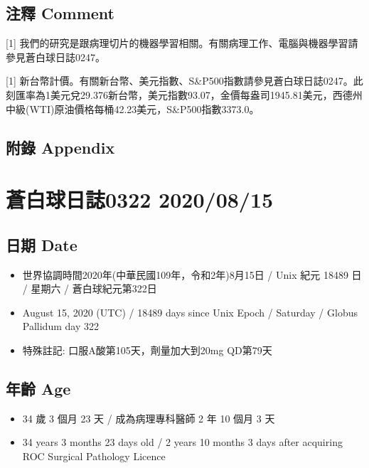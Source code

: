 \documentclass[a5paper, 11pt
]{book}
\providecommand{\tightlist}{%
  \setlength{\itemsep}{0pt}\setlength{\parskip}{0pt}}
\begin{document}
\hypertarget{ux6ce8ux91cb-comment-64}{%
\subsection{注釋 Comment}\label{ux6ce8ux91cb-comment-64}}

{[}1{]}
我們的研究是跟病理切片的機器學習相關。有關病理工作、電腦與機器學習請參見蒼白球日誌0247。

{[}1{]}
新台幣計價。有關新台幣、美元指數、S\&P500指數請參見蒼白球日誌0247。此刻匯率為1美元兌29.376新台幣，美元指數93.07，金價每盎司1945.81美元，西德州中級(WTI)原油價格每桶42.23美元，S\&P500指數3373.0。

\hypertarget{ux9644ux9304-appendix-64}{%
\subsection{附錄 Appendix}\label{ux9644ux9304-appendix-64}}

\hypertarget{ux84bcux767dux7403ux65e5ux8a8c0322-20200815}{%
\section{蒼白球日誌0322
2020/08/15}\label{ux84bcux767dux7403ux65e5ux8a8c0322-20200815}}

\hypertarget{ux65e5ux671f-date-65}{%
\subsection{日期 Date}\label{ux65e5ux671f-date-65}}

\begin{itemize}
\tightlist
\item
  世界協調時間2020年(中華民國109年，令和2年)8月15日 / Unix 紀元 18489 日
  / 星期六 / 蒼白球紀元第322日
\item
  August 15, 2020 (UTC) / 18489 days since Unix Epoch / Saturday /
  Globus Pallidum day 322
\item
  特殊註記: 口服A酸第105天，劑量加大到20mg QD第79天
\end{itemize}

\hypertarget{ux5e74ux9f61-age-65}{%
\subsection{年齡 Age}\label{ux5e74ux9f61-age-65}}

\begin{itemize}
\tightlist
\item
  34 歲 3 個月 23 天 / 成為病理專科醫師 2 年 10 個月 3 天
\item
  34 years 3 months 23 days old / 2 years 10 months 3 days after
  acquiring ROC Surgical Pathology Licence
\end{itemize}
\end{document}
